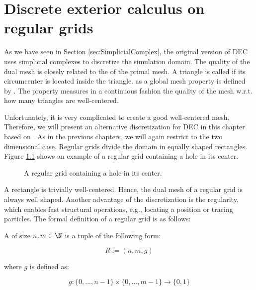\chapter{Discrete exterior calculus on regular grids}
\label{ch:grids}

As we have seen in Section \ref{sec:SimplicialComplex}, the original version of DEC uses simplicial complexes to discretize the simulation domain. 
The quality of the dual mesh is closely related to the  of the primal mesh.
A triangle is called  if its circumcenter is located inside the triangle.
 as a global mesh property is defined by .
The property measures in a continuous fashion the quality of the mesh w.r.t. how many triangles are well-centered.

Unfortunately, it is very complicated to create a good well-centered mesh.
Therefore, we will present an alternative discretization for DEC in this chapter based on .
As in the previous chapters, we will again restrict to the two dimensional case.
Regular grids divide the domain in equally shaped rectangles. 
Figure \ref{fig:RegGrid} shows an example of a regular grid containing a hole in its center.

\begin{figure}[htbp]
	\centering
 	
	\caption{A regular grid containing a hole in its center.}
	\label{fig:RegGrid}
\end{figure}	

A rectangle is trivially well-centered. Hence, the dual mesh of a regular grid is always well shaped.
Another advantage of the discretization is the regularity, which enables fast structural operations, e.g., locating a position or tracing particles.
The formal definition of a regular grid is as follows:

\begin{definition}
A  of size $n,m \in \N$ is a tuple of the  following form:

\begin{equation}
R:=(n,m,g)
\end{equation}

where $g$ is defined as:

\begin{equation}
g : \{ 0 , ... , n - 1 \} \times\{ 0 , ... , m - 1 \} \rightarrow \{0,1\}
\end{equation}

\end{definition}


